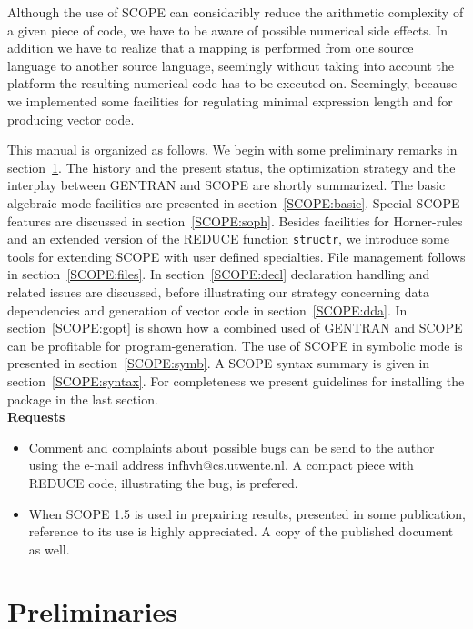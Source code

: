 Although the use of SCOPE can considaribly reduce the arithmetic complexity
of a given piece of code,
we have to be aware of possible numerical side effects. In addition we have
to realize that a mapping is performed from one source language to another 
source language, seemingly without taking into account the platform the resulting 
numerical code has to be executed on. Seemingly, because we implemented some
facilities for regulating minimal expression length  and for producing
vector code.

This manual is organized as follows. We begin with some preliminary remarks
in section~\ref{SCOPE:prel}. The history and the present status, 
the optimization
strategy and the interplay between GENTRAN and SCOPE are shortly summarized.
The basic algebraic mode facilities are presented in
section~\ref{SCOPE:basic}. Special SCOPE features are discussed in 
section~\ref{SCOPE:soph}. Besides facilities for Horner-rules and an extended
version of the REDUCE function {\tt structr}, we introduce some tools for
extending  SCOPE with user defined specialties. File management follows in
section~\ref{SCOPE:files}. In section~\ref{SCOPE:decl} declaration handling
and related issues are discussed, before illustrating our strategy concerning
data dependencies and generation of vector code in section~\ref{SCOPE:dda}. 
In section~\ref{SCOPE:gopt} is shown how a combined used of GENTRAN and SCOPE 
can be profitable for pro\-gram-ge\-ne\-ra\-ti\-on. The use of SCOPE in 
symbolic mode is presented in section~\ref{SCOPE:symb}. A SCOPE syntax
summary is given in section~\ref{SCOPE:syntax}.
For completeness we present guidelines for installing the 
package in the last section.\\

{\bf Requests}
\begin{itemize}
\item Comment and complaints about possible bugs can be send to the author 
using the e-mail address infhvh@cs.utwente.nl. A compact piece with 
REDUCE code, illustrating the bug, is prefered. 
\item When SCOPE 1.5 is used in prepairing results, presented in some 
publication, reference to its use is highly appreciated. A copy of the 
published document as well.
\end{itemize}
\newpage

\section{Preliminaries}\label{SCOPE:prel}

